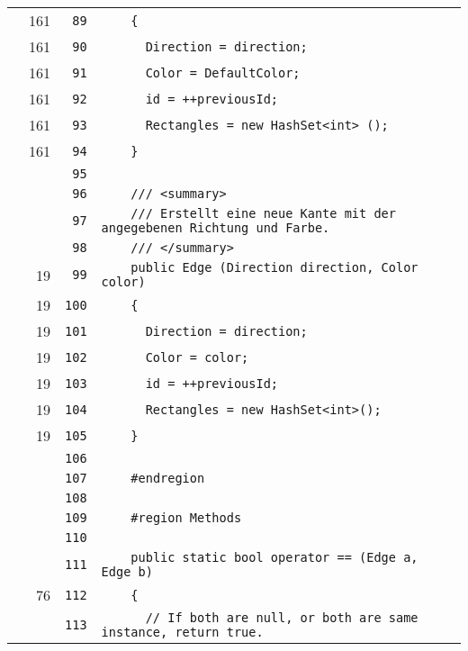 \documentclass[a4paper,10pt]{article}
\begin{document}
\begin{longtable}[l]{lrrl}
\cellcolor{green} & 161 & \verb~89~ & \verb~    {~\\
\cellcolor{green} & 161 & \verb~90~ & \verb~      Direction = direction;~\\
\cellcolor{green} & 161 & \verb~91~ & \verb~      Color = DefaultColor;~\\
\cellcolor{green} & 161 & \verb~92~ & \verb~      id = ++previousId;~\\
\cellcolor{green} & 161 & \verb~93~ & \verb~      Rectangles = new HashSet<int> ();~\\
\cellcolor{green} & 161 & \verb~94~ & \verb~    }~\\
\cellcolor{gray} &  & \verb~95~ & \verb~~\\
\cellcolor{gray} &  & \verb~96~ & \verb~    /// <summary>~\\
\cellcolor{gray} &  & \verb~97~ & \verb~    /// Erstellt eine neue Kante mit der angegebenen Richtung und Farbe.~\\
\cellcolor{gray} &  & \verb~98~ & \verb~    /// </summary>~\\
\cellcolor{green} & 19 & \verb~99~ & \verb~    public Edge (Direction direction, Color color)~\\
\cellcolor{green} & 19 & \verb~100~ & \verb~    {~\\
\cellcolor{green} & 19 & \verb~101~ & \verb~      Direction = direction;~\\
\cellcolor{green} & 19 & \verb~102~ & \verb~      Color = color;~\\
\cellcolor{green} & 19 & \verb~103~ & \verb~      id = ++previousId;~\\
\cellcolor{green} & 19 & \verb~104~ & \verb~      Rectangles = new HashSet<int>();~\\
\cellcolor{green} & 19 & \verb~105~ & \verb~    }~\\
\cellcolor{gray} &  & \verb~106~ & \verb~~\\
\cellcolor{gray} &  & \verb~107~ & \verb~    #endregion~\\
\cellcolor{gray} &  & \verb~108~ & \verb~~\\
\cellcolor{gray} &  & \verb~109~ & \verb~    #region Methods~\\
\cellcolor{gray} &  & \verb~110~ & \verb~~\\
\cellcolor{gray} &  & \verb~111~ & \verb~    public static bool operator == (Edge a, Edge b)~\\
\cellcolor{green} & 76 & \verb~112~ & \verb~    {~\\
\cellcolor{gray} &  & \verb~113~ & \verb~      // If both are null, or both are same instance, return true.~\\

\end{longtable}
\end{document}
